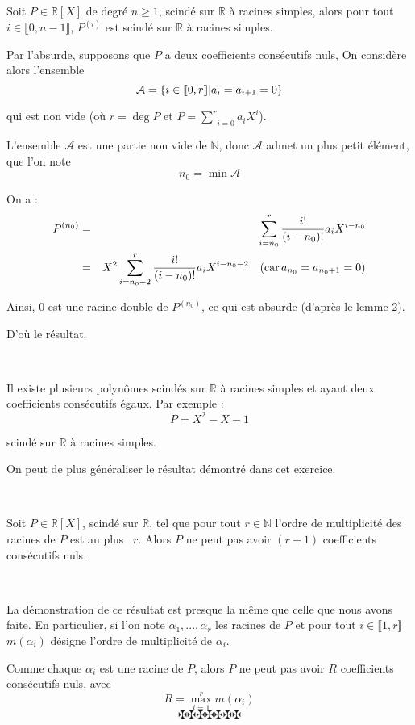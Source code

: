 Soit $P \in \mathbb{R}[X]$ de degr{\'e} $n \geq 1$, scind{\'e} sur
$\mathbb{R}$ {\`a} racines simples, alors pour tout $i \in \llbracket 0, n - 1
\rrbracket$, $P^{(i)}$ est scind{\'e} sur $\mathbb{R}$ {\`a} racines simples.


Par l'absurde, supposons que $P$ a deux coefficients cons{\'e}cutifs nuls, On
consid{\`e}re alors l'ensemble
\[ \mathcal{A}=\{i \in \llbracket 0, r \rrbracket  |  a_i = a_{i +
   1} = 0\} \]


qui est non vide (o{\`u} $r = \deg P$ et $P = \underset{i =
0}{\overset{r}{\sum}} a_i X^i$).

L'ensemble $\mathcal{A}$ est une partie non vide de $\mathbb{N}$, donc
$\mathcal{A}$ admet un plus petit {\'e}l{\'e}ment, que l'on note
\[ n_0 = \min \mathcal{A} \]


On a :
\begin{eqnarray*}
  P^{(n_0)}  & = &  \sum_{i = n_0}^r \frac{i!}{(i - n_0) !} a_i X^{i - n_0}\\
  & = & X^2 \sum_{i = n_0 + 2}^r \frac{i!}{(i - n_0) !} a_i X^{i - n_0 - 2}
  \quad (\operatorname{car} a_{n_0} = a_{n_0 + 1} = 0)
\end{eqnarray*}


Ainsi, $0$ est une racine double de $P^{(n_0)}$, ce qui est absurde
(d'apr{\`e}s le lemme 2).

D'o{\`u} le r{\'e}sultat.

\


Il existe plusieurs polyn{\^o}mes scind{\'e}s sur $\mathbb{R}$ {\`a} racines
simples et ayant deux coefficients cons{\'e}cutifs {\'e}gaux. Par exemple :
\[ P = X^2 - X - 1 \]


scind{\'e} sur $\mathbb{R}$ {\`a} racines simples.

On peut de plus g{\'e}n{\'e}raliser le r{\'e}sultat d{\'e}montr{\'e} dans cet
exercice.

\


Soit $P \in \mathbb{R}[X]$, scind{\'e} sur $\mathbb{R}$, tel que pour tout $r
\in \mathbb{N}$ l'ordre de multiplicit{\'e} des racines de $P$ est au plus \
$r$. Alors $P$ ne peut pas avoir $(r + 1)$ coefficients cons{\'e}cutifs nuls.

\

La d{\'e}monstration de ce r{\'e}sultat est presque la m{\^e}me que celle que
nous avons faite. En particulier, si l'on note $\alpha_1, ..., \alpha_r$ les
racines de $P$ et pour tout $i \in \llbracket 1, r \rrbracket$ $m (\alpha_i)$
d{\'e}signe l'ordre de multiplicit{\'e} de $\alpha_i$.

Comme chaque $\alpha_i$ est une racine de $P$, alors $P$ ne peut pas avoir $R$
coefficients cons{\'e}cutifs nuls, avec
\[ R = \underset{i = 1}{\overset{r}{\max}} m (\alpha_i) \]
\[ \maltese \maltese \maltese \maltese \maltese \maltese \maltese \]

